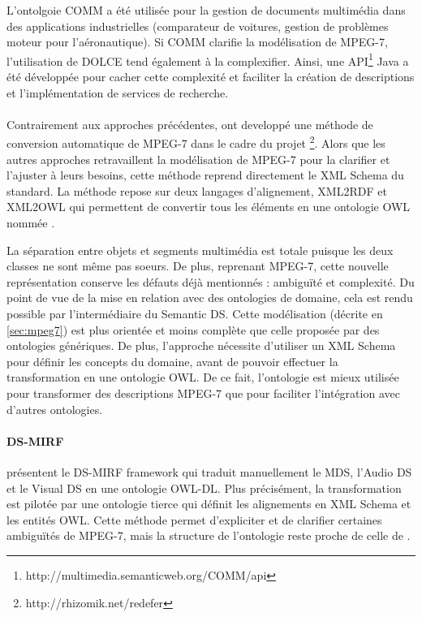 L'ontolgoie COMM a été utilisée pour la gestion de documents multimédia dans des applications industrielles (comparateur de voitures, gestion de problèmes moteur pour l'aéronautique).
Si COMM clarifie la modélisation de MPEG-7, l'utilisation de DOLCE tend également à la complexifier.
Ainsi, une API\footnote{http://multimedia.semanticweb.org/COMM/api} Java a été développée pour cacher cette complexité et faciliter la création de descriptions et l'implémentation de services de recherche.



\paragraph{}
Contrairement aux approches précédentes, \cite{Garcia2005} ont developpé une méthode de conversion automatique de MPEG-7 dans le cadre du projet \footnote{http://rhizomik.net/redefer}.
Alors que les autres approches retravaillent la modélisation de MPEG-7 pour la clarifier et l'ajuster à leurs besoins, cette méthode reprend directement le XML Schema du standard.
La méthode repose sur deux langages d'alignement, XML2RDF et XML2OWL qui permettent de convertir tous les éléments en une ontologie OWL nommée .

La séparation entre objets et segments multimédia est totale puisque les deux classes ne sont même pas soeurs.
De plus, reprenant MPEG-7, cette nouvelle représentation conserve les défauts déjà mentionnés : ambiguïté et complexité.
Du point de vue de la mise en relation avec des ontologies de domaine, cela est rendu possible par l'intermédiaire du Semantic DS.
Cette modélisation (décrite en \ref{sec:mpeg7}) est plus orientée et moins complète que celle proposée par des ontologies génériques.
De plus, l'approche nécessite d'utiliser un XML Schema pour définir les concepts du domaine, avant de pouvoir effectuer la transformation en une ontologie OWL.
De ce fait, l'ontologie est mieux utilisée pour transformer des descriptions MPEG-7 que pour faciliter l'intégration avec d'autres ontologies.


\paragraph{DS-MIRF}
\cite{Tsinaraki2004a, Tsinaraki2007} présentent le DS-MIRF framework qui traduit manuellement le MDS, l'Audio DS et le Visual DS en une ontologie OWL-DL.
Plus précisément, la transformation est pilotée par une ontologie tierce qui définit les alignements en XML Schema et les entités OWL.
Cette méthode permet d'expliciter et de clarifier certaines ambiguïtés de MPEG-7, mais la structure de l'ontologie reste proche de celle de .

